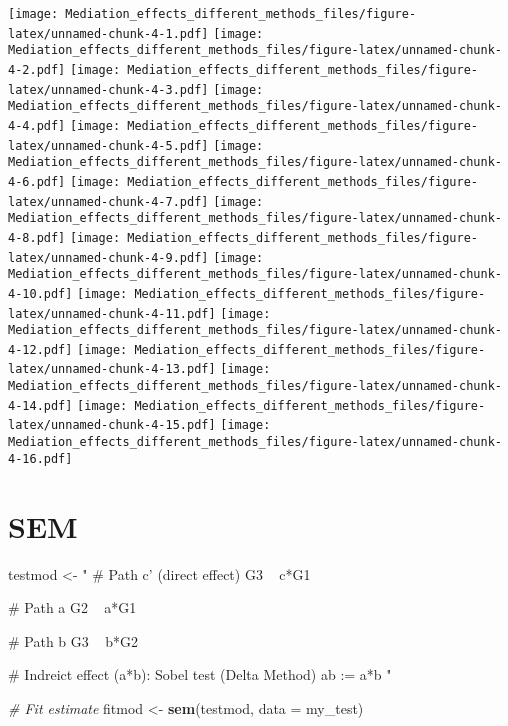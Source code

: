 \documentclass[
]{article}
\newenvironment{Shaded}{\begin{snugshade}}{\end{snugshade}}
\newcommand{\CommentTok}[1]{\textcolor[rgb]{0.56,0.35,0.01}{\textit{#1}}}
\newcommand{\DataTypeTok}[1]{\textcolor[rgb]{0.13,0.29,0.53}{#1}}
\newcommand{\KeywordTok}[1]{\textcolor[rgb]{0.13,0.29,0.53}{\textbf{#1}}}
\newcommand{\NormalTok}[1]{#1}
\newcommand{\OperatorTok}[1]{\textcolor[rgb]{0.81,0.36,0.00}{\textbf{#1}}}
\newcommand{\StringTok}[1]{\textcolor[rgb]{0.31,0.60,0.02}{#1}}
\begin{document}
\texttt{[image: Mediation\_effects\_different\_methods\_files/figure-latex/unnamed-chunk-4-1.pdf]}
\texttt{[image: Mediation\_effects\_different\_methods\_files/figure-latex/unnamed-chunk-4-2.pdf]}
\texttt{[image: Mediation\_effects\_different\_methods\_files/figure-latex/unnamed-chunk-4-3.pdf]}
\texttt{[image: Mediation\_effects\_different\_methods\_files/figure-latex/unnamed-chunk-4-4.pdf]}
\texttt{[image: Mediation\_effects\_different\_methods\_files/figure-latex/unnamed-chunk-4-5.pdf]}
\texttt{[image: Mediation\_effects\_different\_methods\_files/figure-latex/unnamed-chunk-4-6.pdf]}
\texttt{[image: Mediation\_effects\_different\_methods\_files/figure-latex/unnamed-chunk-4-7.pdf]}
\texttt{[image: Mediation\_effects\_different\_methods\_files/figure-latex/unnamed-chunk-4-8.pdf]}
\texttt{[image: Mediation\_effects\_different\_methods\_files/figure-latex/unnamed-chunk-4-9.pdf]}
\texttt{[image: Mediation\_effects\_different\_methods\_files/figure-latex/unnamed-chunk-4-10.pdf]}
\texttt{[image: Mediation\_effects\_different\_methods\_files/figure-latex/unnamed-chunk-4-11.pdf]}
\texttt{[image: Mediation\_effects\_different\_methods\_files/figure-latex/unnamed-chunk-4-12.pdf]}
\texttt{[image: Mediation\_effects\_different\_methods\_files/figure-latex/unnamed-chunk-4-13.pdf]}
\texttt{[image: Mediation\_effects\_different\_methods\_files/figure-latex/unnamed-chunk-4-14.pdf]}
\texttt{[image: Mediation\_effects\_different\_methods\_files/figure-latex/unnamed-chunk-4-15.pdf]}
\texttt{[image: Mediation\_effects\_different\_methods\_files/figure-latex/unnamed-chunk-4-16.pdf]}

\begin{Shaded}
\end{Shaded}

\hypertarget{sem}{%
\section{SEM}\label{sem}}

\begin{Shaded}
\begin{Highlighting}[]
\NormalTok{testmod <-}\StringTok{ "}
\StringTok{# Path c' (direct effect)}
\StringTok{G3 ~ c*G1 }

\StringTok{# Path a}
\StringTok{G2 ~ a*G1}

\StringTok{# Path b}
\StringTok{G3 ~ b*G2}

\StringTok{# Indreict effect (a*b): Sobel test (Delta Method)}
\StringTok{ab := a*b}
\StringTok{"}

\CommentTok{# Fit estimate}
\NormalTok{fitmod <-}\StringTok{ }\KeywordTok{sem}\NormalTok{(testmod, }\DataTypeTok{data =}\NormalTok{ my_test)}
\end{Highlighting}
\end{Shaded}
\end{document}
